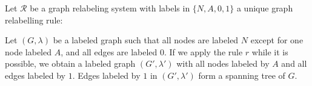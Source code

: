   
\begin{example}
  \label{example:gls_spinning_tree}
  Let \(\mathcal{R}\) be a graph relabeling system with labels in \( \{N, A, 0, 1\}\) a unique graph relabelling rule:

  \begin{center}
  \end{center}

  Let \( (G, \lambda) \) be a labeled graph such that all nodes are labeled \(N\) except for one node labeled \(A\), and all edges are labeled \(0\). 
  If we apply the rule \(r\) while it is possible, we obtain a labeled graph \( (G', \lambda') \) with all nodes labeled by \(A\) and all edges labeled by \(1\). Edges labeled by \(1\) in \( (G', \lambda') \) form a spanning tree of \( G \). 
\end{example}

